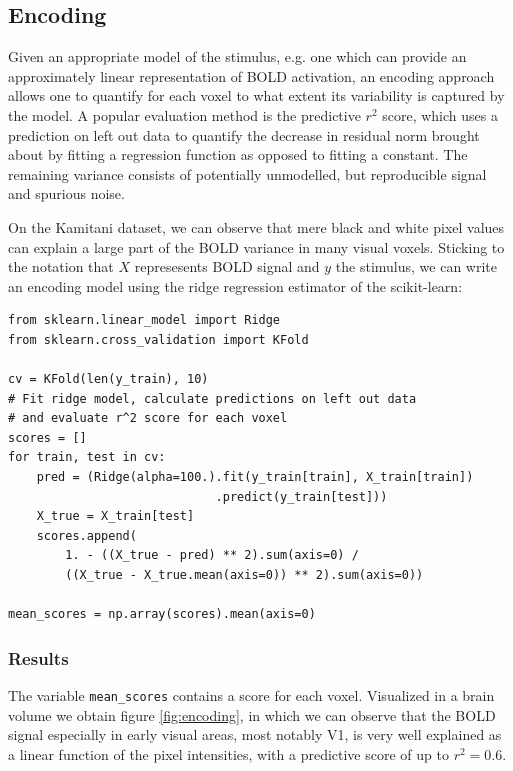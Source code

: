 \documentclass{frontiersSCNS} %
\begin{document}
\subsection{Encoding}
Given an appropriate model of the stimulus, e.g. one which can provide an approximately linear representation of BOLD activation, an encoding approach allows one to quantify for each voxel to what extent its variability is captured by the model. A popular evaluation method is the predictive \(r^2\) score, which uses a prediction on left out data to quantify the decrease in residual norm brought about by fitting a regression function as opposed to fitting a constant. %
The remaining variance consists of potentially unmodelled, but reproducible signal and spurious noise.

On the Kamitani dataset, we can observe that mere black and white pixel values can explain a large part of the BOLD variance in many visual voxels. Sticking to the notation that \(X\) represesents BOLD signal and \(y\) the stimulus, we can write an encoding model using the ridge regression estimator of the scikit-learn:

\begin{lstlisting}
from sklearn.linear_model import Ridge
from sklearn.cross_validation import KFold

cv = KFold(len(y_train), 10)
# Fit ridge model, calculate predictions on left out data
# and evaluate r^2 score for each voxel
scores = []
for train, test in cv:
    pred = (Ridge(alpha=100.).fit(y_train[train], X_train[train])
                             .predict(y_train[test]))
    X_true = X_train[test]
    scores.append(
        1. - ((X_true - pred) ** 2).sum(axis=0) /
        ((X_true - X_true.mean(axis=0)) ** 2).sum(axis=0))
    
mean_scores = np.array(scores).mean(axis=0)
\end{lstlisting}

\subsubsection{Results}
The variable \texttt{mean\_scores} contains a score for each voxel. Visualized in a brain volume we obtain figure \ref{fig:encoding}, in which we can observe that the BOLD signal especially in early visual areas, most notably V1, is very well explained as a linear function of the pixel intensities, with a predictive score of up to \(r^2 = 0.6\).
\end{document}
